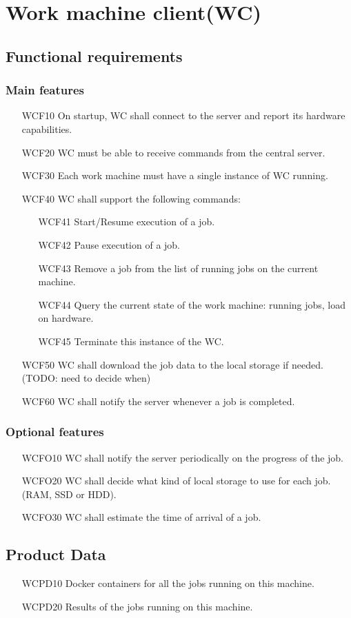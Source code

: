 \section{Work machine client(WC)}
  \subsection{Functional requirements}
    \subsubsection{Main features}
    \begin{enumerate}
      \item[WCF10] On startup, WC shall connect to the server and report its hardware capabilities.
      \item[WCF20] WC must be able to receive commands from the central server.
      \item[WCF30] Each work machine must have a single instance of WC running.
      \item[WCF40] WC shall support the following commands:
      \begin{enumerate}
        \item[WCF41] Start/Resume execution of a job.
        \item[WCF42] Pause execution of a job.
        \item[WCF43] Remove a job from the list of running jobs on the current machine.
        \item[WCF44] Query the current state of the work machine: running jobs, load on hardware.
        \item[WCF45] Terminate this instance of the WC.
      \end{enumerate}
      \item[WCF50] WC shall download the job data to the local storage if needed. (TODO: need to decide when)
      \item[WCF60] WC shall notify the server whenever a job is completed.
    \end{enumerate}

    \subsubsection{Optional features}
      \begin{enumerate}
        \item[WCFO10] WC shall notify the server periodically on the progress of the job.
        \item[WCFO20] WC shall decide what kind of local storage to use for each job. (RAM, SSD or HDD).
        \item[WCFO30] WC shall estimate the time of arrival of a job.
      \end{enumerate}

  \subsection{Product Data}
  \begin{enumerate}
    \item[WCPD10] Docker containers for all the jobs running on this machine.
    \item[WCPD20] Results of the jobs running on this machine.
  \end{enumerate}
